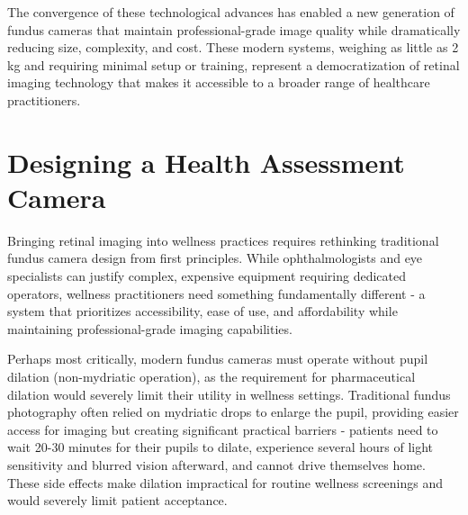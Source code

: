 \documentclass[
  Letterpaper,
]{scrbook}
\begin{document}
The convergence of these technological advances has enabled a new
generation of fundus cameras that maintain professional-grade image
quality while dramatically reducing size, complexity, and cost. These
modern systems, weighing as little as 2 kg and requiring minimal setup
or training, represent a democratization of retinal imaging technology
that makes it accessible to a broader range of healthcare practitioners.

\section{Designing a Health Assessment
Camera}\label{designing-a-health-assessment-camera}

Bringing retinal imaging into wellness practices requires rethinking
traditional fundus camera design from first principles. While
ophthalmologists and eye specialists can justify complex, expensive
equipment requiring dedicated operators, wellness practitioners need
something fundamentally different - a system that prioritizes
accessibility, ease of use, and affordability while maintaining
professional-grade imaging capabilities.

Perhaps most critically, modern fundus cameras must operate without
pupil dilation (non-mydriatic operation), as the requirement for
pharmaceutical dilation would severely limit their utility in wellness
settings. Traditional fundus photography often relied on mydriatic drops
to enlarge the pupil, providing easier access for imaging but creating
significant practical barriers - patients need to wait 20-30 minutes for
their pupils to dilate, experience several hours of light sensitivity
and blurred vision afterward, and cannot drive themselves home. These
side effects make dilation impractical for routine wellness screenings
and would severely limit patient acceptance.
\end{document}
